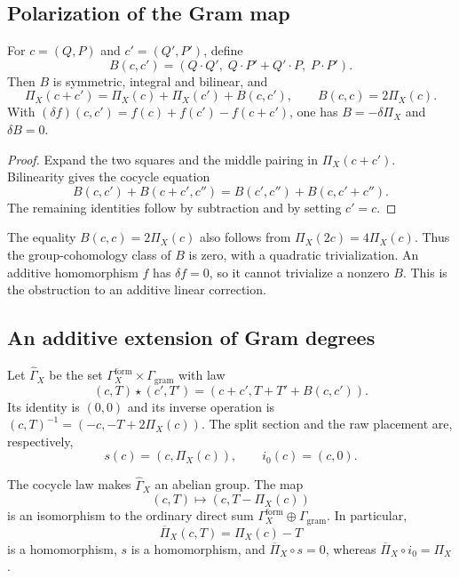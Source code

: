 \subsection{Polarization of the Gram map}
\label{subsec:gram-cocycle-appendixC}

\begin{lemma}
\label{lem:gram-additivity-defect-appendixC}
For $c=(Q,P)$ and $c'=(Q',P')$, define
\[
B(c,c')=(Q\cdot Q',\;Q\cdot P'+Q'\cdot P,\;P\cdot P').
\]
Then $B$ is symmetric, integral and bilinear, and
\[
\Pi_X(c+c')=\Pi_X(c)+\Pi_X(c')+B(c,c'),\qquad B(c,c)=2\Pi_X(c).
\]
With $(\delta f)(c,c')=f(c)+f(c')-f(c+c')$, one has
$B=-\delta\Pi_X$ and $\delta B=0$.
\end{lemma}

\begin{proof}
Expand the two squares and the middle pairing in $\Pi_X(c+c')$.
Bilinearity gives the cocycle equation
\[
B(c,c')+B(c+c',c'')=B(c',c'')+B(c,c'+c'').
\]
The remaining identities follow by subtraction and by setting $c'=c$.
\end{proof}

\begin{remark}
\label{rem:cleanly-stated-polarization-identity}
The equality $B(c,c)=2\Pi_X(c)$ also follows from
$\Pi_X(2c)=4\Pi_X(c)$.  Thus the group-cohomology class of $B$ is
zero, with a quadratic trivialization.  An additive homomorphism
$f$ has $\delta f=0$, so it cannot trivialize a nonzero $B$.
This is the obstruction to an additive linear correction.
\end{remark}

\subsection{An additive extension of Gram degrees}
\label{subsec:normal-ordered-gram-map-appendixC}

\begin{definition}
\label{def:normal-ordered-charge-lattice-appendixC}
Let $\widehat\Gamma_X$ be the set
$\Gamma_X^{\mathrm{form}}\times\Gamma_{\mathrm{gram}}$ with law
\[
(c,T)\star(c',T')=(c+c',T+T'+B(c,c')).
\]
Its identity is $(0,0)$ and its inverse operation is
$(c,T)^{-1}=(-c,-T+2\Pi_X(c))$.  The split section and the raw
placement are, respectively,
\[
s(c)=(c,\Pi_X(c)),\qquad i_0(c)=(c,0).
\]
\end{definition}

\begin{proposition}
\label{prop:normal-ordered-gram-homomorphism-appendixC}
The cocycle law makes $\widehat\Gamma_X$ an abelian group.  The map
\[
(c,T)\longmapsto(c,T-\Pi_X(c))
\]
is an isomorphism to the ordinary direct sum
$\Gamma_X^{\mathrm{form}}\oplus\Gamma_{\mathrm{gram}}$.
In particular,
\[
\overline\Pi_X(c,T)=\Pi_X(c)-T
\]
is a homomorphism, $s$ is a homomorphism, and
$\overline\Pi_X\circ s=0$, whereas
$\overline\Pi_X\circ i_0=\Pi_X$.
\end{proposition}

